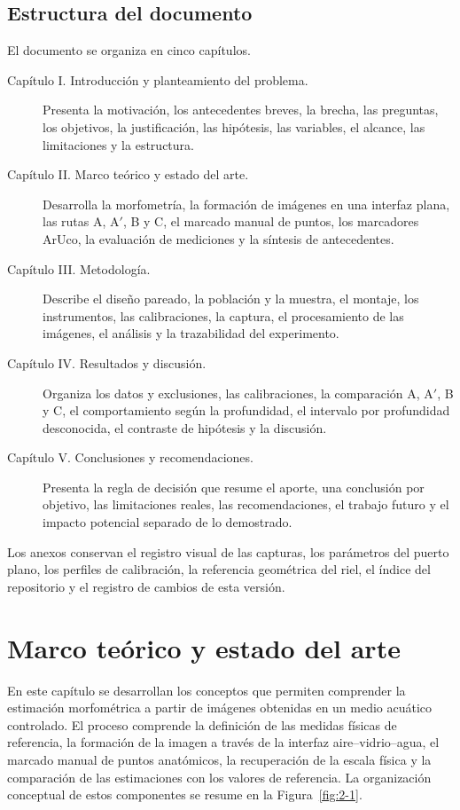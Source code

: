 \documentclass{report}
\newcommand{\Aprime}{A$'$}
\begin{document}
\section{Estructura del documento}

El documento se organiza en cinco capítulos.

\begin{description}
  \item[Capítulo I. Introducción y planteamiento del problema.] Presenta la motivación, los antecedentes breves, la brecha, las preguntas, los objetivos, la justificación, las hipótesis, las variables, el alcance, las limitaciones y la estructura.
  \item[Capítulo II. Marco teórico y estado del arte.] Desarrolla la morfometría, la formación de imágenes en una interfaz plana, las rutas A, \Aprime, B y C, el marcado manual de puntos, los marcadores ArUco, la evaluación de mediciones y la síntesis de antecedentes.
  \item[Capítulo III. Metodología.] Describe el diseño pareado, la población y la muestra, el montaje, los instrumentos, las calibraciones, la captura, el procesamiento de las imágenes, el análisis y la trazabilidad del experimento.
  \item[Capítulo IV. Resultados y discusión.] Organiza los datos y exclusiones, las calibraciones, la comparación A, \Aprime, B y C, el comportamiento según la profundidad, el intervalo por profundidad desconocida, el contraste de hipótesis y la discusión.
  \item[Capítulo V. Conclusiones y recomendaciones.] Presenta la regla de decisión que resume el aporte, una conclusión por objetivo, las limitaciones reales, las recomendaciones, el trabajo futuro y el impacto potencial separado de lo demostrado.
\end{description}

Los anexos conservan el registro visual de las capturas, los parámetros del puerto plano, los perfiles de calibración, la referencia geométrica del riel, el índice del repositorio y el registro de cambios de esta versión.

\chapter{Marco teórico y estado del arte}
\label{cap:marco}

En este capítulo se desarrollan los conceptos que permiten comprender la estimación morfométrica a partir de imágenes obtenidas en un medio acuático controlado. El proceso comprende la definición de las medidas físicas de referencia, la formación de la imagen a través de la interfaz aire--vidrio--agua, el marcado manual de puntos anatómicos, la recuperación de la escala física y la comparación de las estimaciones con los valores de referencia. La organización conceptual de estos componentes se resume en la Figura~\ref{fig:2-1}.
\end{document}
